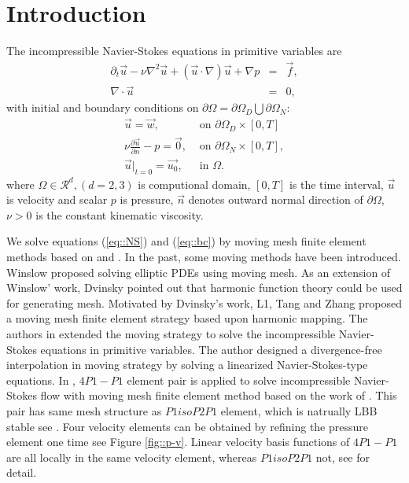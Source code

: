 \documentclass{eajam}
\begin{document}
\section{Introduction}
    \label{sec1} The incompressible Navier-Stokes equations in
    primitive variables are 
    \begin{equation}
      \begin{array}{rcl}
         \partial_t \vec{u} - \nu \nabla^2 \vec{u} +
        (\vec{u} \cdot \nabla )\vec{u} + \nabla p & =
        & \vec{f},\\
        \nabla \cdot \vec{u} & = & 0,
      \end{array}
      \label{eq::NS}
    \end{equation}
    with initial and boundary conditions on $\partial
    \Omega = \partial \Omega_D \bigcup \partial \Omega_N$:
    \begin{equation}
      \begin{array}{ll}
        \vec{u} = \vec{w},& \mbox{ on } \partial \Omega_D \times [0,
        T]\\
        \nu \displaystyle \frac{\partial \vec{u}}{\partial n} - p =
        \vec{0}, & \mbox{ on } \partial \Omega_N \times [0, T],  \\
        \vec{u}|_{t = 0} = \vec{u_0}, & \mbox{ in } \Omega. 
      \end{array}
      \label{eq::bc}
    \end{equation}    
    where $\Omega \in \mathcal{R}^d,(d = 2, 3)$ is computional domain,
    $[0,T]$ is the time interval, $\vec{u}$ is velocity and scalar $p$
    is pressure, $\vec{n}$ denotes outward normal direction of
    $\partial \Omega$, $\nu > 0$ is the constant kinematic
    viscosity.

    We solve equations (\ref{eq::NS}) and (\ref{eq::bc}) by moving
    mesh finite element methods based on \cite{li2001mesh} and
    \cite{di2005}. In the past, some moving methods have been
    introduced. Winslow \cite{Winslow1966NUMERICAL} proposed solving
    elliptic PDEs using moving mesh. As an extension of Winslow' work,
    Dvinsky \cite{dvinsky1991adaptive} pointed out that harmonic
    function theory could be used for generating mesh. Motivated by
    Dvinsky's work, L1, Tang and Zhang \cite{li2001mesh} proposed a
    moving mesh finite element strategy based upon harmonic
    mapping. The authors in \cite{di2005moving} extended the moving
    strategy to solve the incompressible Navier-Stokes equations in
    primitive variables. The author designed a divergence-free
    interpolation in moving strategy by solving a linearized
    Navier-Stokes-type equations. In \cite{Wu2016moving}, $4P1-P1$
    element pair is applied to solve incompressible Navier-Stokes flow
    with moving mesh finite element method based on the work of
    \cite{di2005moving}. This pair has same mesh structure as
    $P1isoP2P1$ element, which is natrually LBB stable see
    \cite{bercovier1979error}. Four velocity elements can be obtained
    by refining the pressure element one time see Figure
    \ref{fig::p-v}. Linear velocity basis functions of
    $4P1-P1$ are all locally in the same velocity element, whereas
    $P1isoP2P1$ not, see \cite{Wu2016moving} for detail.
\end{document}
